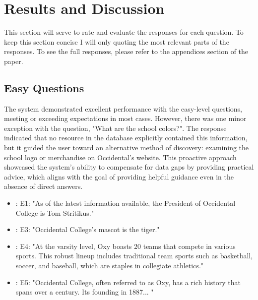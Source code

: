 \documentclass[10pt,twocolumn]{article}
\begin{document}
\section{Results and Discussion}
This section will serve to rate and evaluate the responses for each question. To keep this section concise I will only quoting the most relevant parts of the responses. To see the full responses, please refer to the appendices section of the paper. 

\subsection{Easy Questions}
The system demonstrated excellent performance with the easy-level questions, meeting or exceeding expectations in most cases. However, there was one minor exception with the question, "What are the school colors?". The response indicated that no resource in the database explicitly contained this information, but it guided the user toward an alternative method of discovery: examining the school logo or merchandise on Occidental’s website. This proactive approach showcased the system’s ability to compensate for data gaps by providing practical advice, which aligns with the goal of providing helpful guidance even in the absence of direct answers.

\begin{itemize}
\item: E1: "As of the latest information available, the President of Occidental College is Tom Stritikus."
\item: E3: "Occidental College's mascot is the tiger."
\item: E4: "At the varsity level, Oxy boasts 20 teams that compete in various sports. This robust lineup includes traditional team sports such as basketball, soccer, and baseball, which are staples in collegiate athletics."
\item: E5: "Occidental College, often referred to as Oxy, has a rich history that spans over a century. Its founding in 1887... "
\end{itemize}
\end{document}
